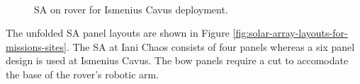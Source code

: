 \begin{figure}[h]
\begin{subfigure}[t]{\subfigureWidth}
		\label{fig:sub:solar-array-on-rover-for-ismenius-cavus-deployed}
	\end{subfigure}\\[0.8ex]
    \caption[Solar array on rover for Ismenius Cavus deployment]
            {\ac{SA} on rover for Ismenius Cavus deployment.}
    \label{fig:solar-array-on-ismenius-cavus-chaos}
\vspace{-2ex}
\end{figure}

\clearpage
The unfolded \ac{SA} panel layouts are shown in Figure \ref{fig:solar-array-layouts-for-missions-sites}. The \ac{SA} at Iani Chaos consists of four panels whereas a six panel design is used at Ismenius Cavus. The bow panels require a cut to accomodate the base of the rover's robotic arm.

\vspace{0.5cm}

